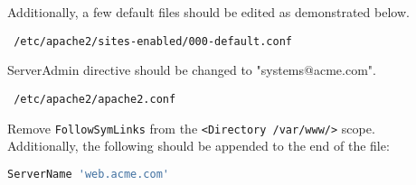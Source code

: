 \noindent
Additionally, a few default files should be edited as demonstrated below. \\

\begin{lstlisting}
 /etc/apache2/sites-enabled/000-default.conf
\end{lstlisting}
\vspace{1em}

\noindent
ServerAdmin directive should be changed to "systems@acme.com". \\

\begin{lstlisting}
 /etc/apache2/apache2.conf
\end{lstlisting}
\vspace{1em}

\noindent
Remove \lstinline$FollowSymLinks$ from the \lstinline$<Directory /var/www/>$
scope. \\

\noindent
Additionally, the following should be appended to the end of the file: \\

\begin{lstlisting}[language=bash, backgroundcolor=\color{Gray}]
ServerName 'web.acme.com' 
\end{lstlisting}
\vspace{1em}
